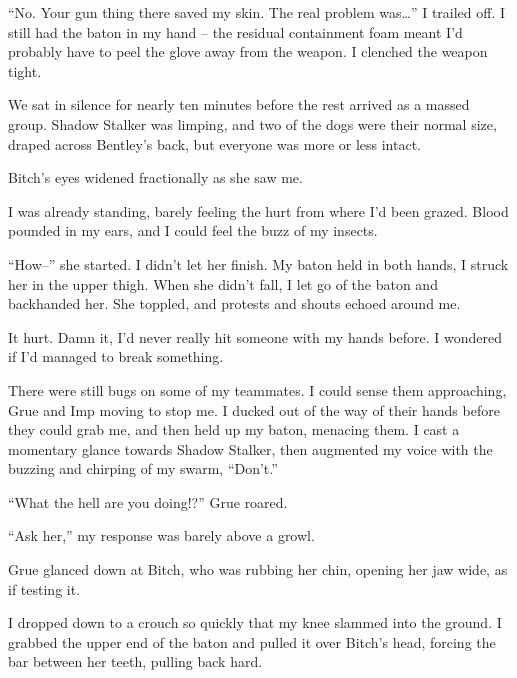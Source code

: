 ``No.  Your gun thing there saved my skin.  The real problem was\ldots'' I trailed off.  I still had the baton in my hand – the residual containment foam meant I'd probably have to peel the glove away from the weapon.  I clenched the weapon tight.



We sat in silence for nearly ten minutes before the rest arrived as a massed group.  Shadow Stalker was limping, and two of the dogs were their normal size, draped across Bentley's back, but everyone was more or less intact.



Bitch's eyes widened fractionally as she saw me.



I was already standing, barely feeling the hurt from where I'd been grazed.  Blood pounded in my ears, and I could feel the buzz of my insects.



``How--'' she started.  I didn't let her finish.  My baton held in both hands, I struck her in the upper thigh.  When she didn't fall, I let go of the baton and backhanded her.  She toppled, and protests and shouts echoed around me.



It hurt.  Damn it, I'd never really hit someone with my hands before.  I wondered if I'd managed to break something.



There were still bugs on some of my teammates.  I could sense them approaching, Grue and Imp moving to stop me.  I ducked out of the way of their hands before they could grab me, and then held up my baton, menacing them.  I cast a momentary glance towards Shadow Stalker, then augmented my voice with the buzzing and chirping of my swarm, ``Don't.''



``What the hell are you doing!?'' Grue roared.



``Ask her,'' my response was barely above a growl.



Grue glanced down at Bitch, who was rubbing her chin, opening her jaw wide, as if testing it.



I dropped down to a crouch so quickly that my knee slammed into the ground.  I grabbed the upper end of the baton and pulled it over Bitch's head, forcing the bar between her teeth, pulling back hard.



